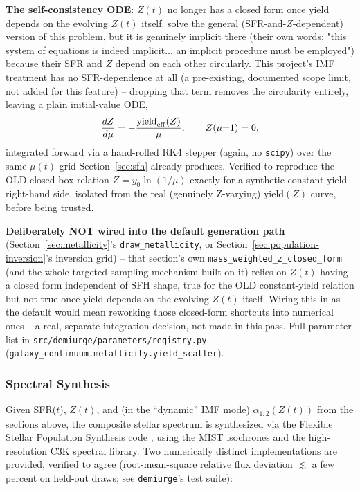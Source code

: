 \documentclass{aastex7}
\begin{document}
\textbf{The self-consistency ODE}: $Z(t)$ no longer has a closed form once
yield depends on the evolving $Z(t)$ itself.
\citet{RecchiKroupa2015} solve the general (SFR-and-$Z$-dependent) version
of this problem, but it is genuinely implicit there (their own words:
"this system of equations is indeed implicit... an implicit procedure must
be employed") because their SFR and $Z$ depend on each other circularly.
This project's IMF treatment has no SFR-dependence at all (a pre-existing,
documented scope limit, not added for this feature) -- dropping that term
removes the circularity entirely, leaving a plain initial-value ODE,
\begin{equation}
    \frac{dZ}{d\mu} = -\frac{\mathrm{yield}_{\rm eff}(Z)}{\mu}, \qquad Z(\mu{=}1)=0,
\end{equation}
integrated forward via a hand-rolled RK4 stepper (again, no \texttt{scipy})
over the same $\mu(t)$ grid Section~\ref{sec:sfh} already produces.
Verified to reproduce the OLD closed-box relation $Z=y_0\ln(1/\mu)$ exactly
for a synthetic constant-yield right-hand side, isolated from the real
(genuinely Z-varying) $\mathrm{yield}(Z)$ curve, before being trusted.

\textbf{Deliberately NOT wired into the default generation path}
(Section~\ref{sec:metallicity}'s \texttt{draw\_metallicity}, or
Section~\ref{sec:population-inversion}'s inversion grid) -- that
section's own \texttt{mass\_weighted\_z\_closed\_form} (and the whole
targeted-sampling mechanism built on it) relies on $Z(t)$ having a closed
form independent of SFH shape, true for the OLD constant-yield relation
but not true once yield depends on the evolving $Z(t)$ itself. Wiring this
in as the default would mean reworking those closed-form shortcuts into
numerical ones -- a real, separate integration decision, not made in this
pass. Full parameter list in \texttt{src/demiurge/parameters/registry.py}
(\texttt{galaxy\_continuum.metallicity.yield\_scatter}).

\subsubsection{Spectral Synthesis}
Given SFR($t$), $Z(t)$, and (in the ``dynamic'' IMF mode) $\alpha_{1,2}(Z(t))$
from the sections above, the composite stellar spectrum is synthesized via
the Flexible Stellar Population Synthesis code \citep[FSPS;][]{Conroy2009,
Conroy2010}, using the MIST isochrones and the high-resolution C3K
spectral library. Two numerically distinct implementations are provided,
verified to agree (root-mean-square relative flux deviation
$\lesssim$ a few percent on held-out draws; see \texttt{demiurge}'s test
suite):
\end{document}
